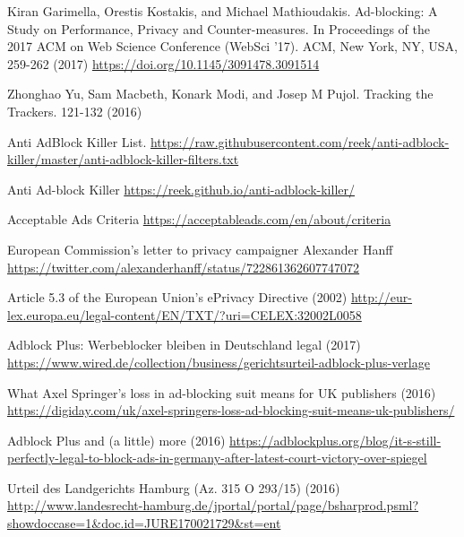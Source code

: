 \documentclass[runningheads,a4paper]{llncs}
\begin{document}
\begin{thebibliography}{x}
 Kiran Garimella, Orestis Kostakis, and Michael Mathioudakis. Ad-blocking: A Study on Performance, Privacy and Counter-measures. In Proceedings of the 2017 ACM on Web Science Conference (WebSci '17). ACM, New York, NY, USA, 259-262 (2017) \url{https://doi.org/10.1145/3091478.3091514}

 Zhonghao Yu, Sam Macbeth, Konark Modi, and Josep M Pujol. Tracking the Trackers. 121-132 (2016)

 Anti AdBlock Killer List. \url{https://raw.githubusercontent.com/reek/anti-adblock-killer/master/anti-adblock-killer-filters.txt}

 Anti Ad-block Killer \url{https://reek.github.io/anti-adblock-killer/}

 Acceptable Ads Criteria
\url{https://acceptableads.com/en/about/criteria}

 European Commission's letter to privacy campaigner Alexander Hanff
\url{https://twitter.com/alexanderhanff/status/722861362607747072}

 Article 5.3 of the European Union's ePrivacy Directive (2002)
\url{http://eur-lex.europa.eu/legal-content/EN/TXT/?uri=CELEX:32002L0058}

 Adblock Plus: Werbeblocker bleiben in Deutschland legal (2017)
\url{https://www.wired.de/collection/business/gerichtsurteil-adblock-plus-verlage}

 What Axel Springer’s loss in ad-blocking suit means for UK publishers (2016)
\url{https://digiday.com/uk/axel-springers-loss-ad-blocking-suit-means-uk-publishers/}

 Adblock Plus and (a little) more (2016)
\url{https://adblockplus.org/blog/it-s-still-perfectly-legal-to-block-ads-in-germany-after-latest-court-victory-over-spiegel}

 Urteil des Landgerichts Hamburg (Az. 315 O 293/15) (2016)
\url{http://www.landesrecht-hamburg.de/jportal/portal/page/bsharprod.psml?showdoccase=1&doc.id=JURE170021729&st=ent}







\end{thebibliography}
\end{document}
